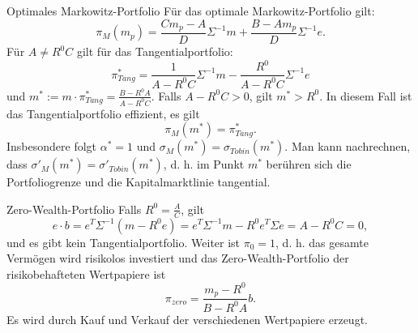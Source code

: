 \begin{karte}{Optimales Markowitz-Portfolio}
Für das optimale Markowitz-Portfolio gilt: 
\[ \pi_M(m_p) = \frac{C m_p - A}{D} \Sigma^{-1} m + \frac{B - A m_p}{D} \Sigma^{-1} e. \]
Für \(A \neq R^0 C\) gilt für das Tangentialportfolio: 
\[ \pi_{Tang}^* = \frac{1}{A - R^0 C} \Sigma^{-1} m - \frac{R^0}{A - R^0 C} \Sigma^{-1} e \]
und \(m^* := m \cdot \pi_{Tang}^* = \frac{B - R^0 A}{A - R^0 C}\). Falls \(A - R^0 C > 0\), gilt 
\(m^* > R^0\). In diesem Fall ist das Tangentialportfolio effizient, es gilt 
\[ \pi_M(m^*) = \pi_{Tang}^*. \]
Insbesondere folgt \(\alpha^* = 1\) und \(\sigma_M(m^*) = \sigma_{Tobin}(m^*)\). 
Man kann nachrechnen, dass \(\sigma'_M(m^*) = \sigma'_{Tobin}(m^*)\), d. h. im Punkt \(m^*\) 
berühren sich die Portfoliogrenze und die Kapitalmarktlinie tangential.
\end{karte}

\begin{karte}{Zero-Wealth-Portfolio}
Falls \(R^0 = \frac{A}{C}\), gilt 
\[e \cdot b = e^T \Sigma^{-1} (m - R^0 e) = e^T \Sigma^{-1} m - R^0 e^T \Sigma e = A - R^0 C = 0,\]
und es gibt kein Tangentialportfolio. Weiter ist \(\pi_0 = 1\), d. h. das gesamte Vermögen wird 
risikolos investiert und das Zero-Wealth-Portfolio der risikobehafteten Wertpapiere ist 
\[ \pi_{zero} = \frac{m_p - R^0}{B - R^0 A}b. \]
Es wird durch Kauf und Verkauf der verschiedenen Wertpapiere erzeugt.
\end{karte}
